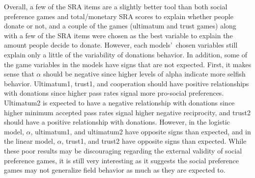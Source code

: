 \documentclass[12pt]{article}
\begin{document}

Overall, a few of the SRA items are a slightly better tool than both social preference games and total/monetary SRA scores to explain whether people donate or not, and a couple of the games (ultimatum and trust games) along with a few of the SRA items were chosen as the best variable to explain the amount people decide to donate. However, each models\rq \ chosen variables still explain only a little of the variability of donations behavior. In addition, some of the game variables in the models have signs that are not expected. First, it makes sense that \(\alpha\) should be negative since higher levels of alpha indicate more selfish behavior. Ultimatum1, trust1, and cooperation should have positive relationships with donations since higher pass rates signal more pro-social preferences. Ultimatum2 is expected to have a negative relationship with donations since higher minimum accepted pass rates signal higher negative reciprocity, and trust2 should have a positive relationship with donations. However, in the logistic model, \(\alpha\), ultimatum1, and ultimatum2 have opposite signs than expected, and in the linear model, \(\alpha\), trust1, and trust2 have opposite signs than expected. While these poor results may be discouraging regarding the external validity of social preference games, it is still very interesting as it suggests the social preference games may not generalize field behavior as much as they are expected to.
\end{document}
